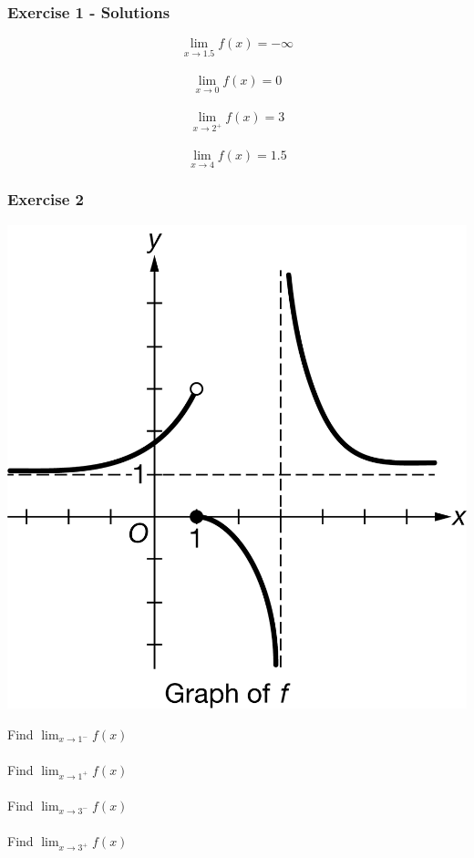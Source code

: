 \documentclass[12pt]{beamer}
\begin{document}
\begin{frame}
	\frametitle{Exercise 1 - Solutions}
	\Large
	\[\displaystyle\lim_{x\to1.5}f(x) = -\infty\]\\
	\[\displaystyle\lim_{x\to0}f(x) = 0\]\\
	\[\displaystyle\lim_{x\to2^{+}}f(x) = 3\]\\
	\[\displaystyle\lim_{x\to4}f(x) = 1.5\]
\end{frame}
\begin{frame}
	\frametitle{Exercise 2}
	\initclock
	\vspace*{\fill}
	\vspace*{\fill}
	\vspace*{\fill}
	\initclock
	\begin{minipage}{0.6\textwidth}
		\includegraphics[scale=0.6]{vasymp2}
	\end{minipage}%
	\begin{minipage}{0.4\textwidth}
		\Large
		Find $\displaystyle\lim_{x\to1^{-}}f(x)$\\
		\\
		Find $\displaystyle\lim_{x\to1^{+}}f(x)$\\
		\\
		Find $\displaystyle\lim_{x\to3^{-}}f(x)$\\
		\\
		Find $\displaystyle\lim_{x\to3^{+}}f(x)$\\
	\end{minipage}\\
	\vspace*{\fill}
	\vspace*{\fill}
	\crono
\end{frame}
\end{document}
